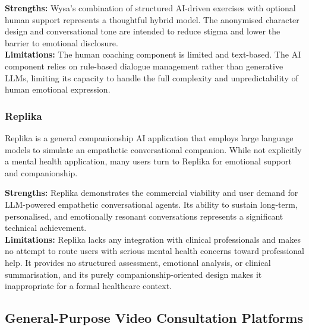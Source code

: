 \begin{tcolorbox}[colback=lightgray, colframe=accentblue, title=\textbf{Wysa — Assessment}, fonttitle=\bfseries, sharp corners=south]
  \textbf{Strengths:} Wysa's combination of structured AI-driven exercises with
  optional human support represents a thoughtful hybrid model. The anonymised
  character design and conversational tone are intended to reduce stigma and lower
  the barrier to emotional disclosure. \\[4pt]
  \textbf{Limitations:} The human coaching component is limited and text-based.
  The AI component relies on rule-based dialogue management rather than generative
  LLMs, limiting its capacity to handle the full complexity and unpredictability
  of human emotional expression.
\end{tcolorbox}

\subsubsection{Replika}

Replika is a general companionship AI application that employs large language
models to simulate an empathetic conversational companion. While not explicitly
a mental health application, many users turn to Replika for emotional support
and companionship.

\begin{tcolorbox}[colback=lightgray, colframe=accentblue, title=\textbf{Replika — Assessment}, fonttitle=\bfseries, sharp corners=south]
  \textbf{Strengths:} Replika demonstrates the commercial viability and user
  demand for LLM-powered empathetic conversational agents. Its ability to sustain
  long-term, personalised, and emotionally resonant conversations represents a
  significant technical achievement. \\[4pt]
  \textbf{Limitations:} Replika lacks any integration with clinical professionals
  and makes no attempt to route users with serious mental health concerns toward
  professional help. It provides no structured assessment, emotional analysis, or
  clinical summarisation, and its purely companionship-oriented design makes it
  inappropriate for a formal healthcare context.
\end{tcolorbox}

\subsection{General-Purpose Video Consultation Platforms}
\label{subsec:video}

